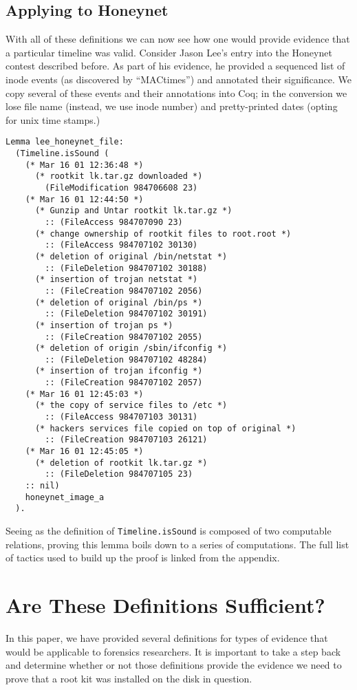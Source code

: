 \documentclass[nocopyrightspace]{sigplanconf}
\begin{document}
\subsection{Applying to Honeynet}
With all of these definitions we can now see how one would provide evidence
that a particular timeline was valid. Consider Jason Lee's entry\cite{lee}
into the Honeynet contest described before. As part of his evidence, he
provided a sequenced list of inode events (as discovered by ``MACtimes'') and
annotated their significance. We copy several of these events and their
annotations into Coq; in the conversion we lose file name (instead, we use
inode number) and pretty-printed dates (opting for unix time stamps.)

\begin{lstlisting}
Lemma lee_honeynet_file:
  (Timeline.isSound (
    (* Mar 16 01 12:36:48 *)
      (* rootkit lk.tar.gz downloaded *)
        (FileModification 984706608 23)
    (* Mar 16 01 12:44:50 *)
      (* Gunzip and Untar rootkit lk.tar.gz *)
        :: (FileAccess 984707090 23)
      (* change ownership of rootkit files to root.root *)
        :: (FileAccess 984707102 30130)
      (* deletion of original /bin/netstat *)
        :: (FileDeletion 984707102 30188)
      (* insertion of trojan netstat *)
        :: (FileCreation 984707102 2056) 
      (* deletion of original /bin/ps *)
        :: (FileDeletion 984707102 30191)
      (* insertion of trojan ps *)
        :: (FileCreation 984707102 2055) 
      (* deletion of origin /sbin/ifconfig *)
        :: (FileDeletion 984707102 48284)
      (* insertion of trojan ifconfig *)
        :: (FileCreation 984707102 2057) 
    (* Mar 16 01 12:45:03 *)
      (* the copy of service files to /etc *)
        :: (FileAccess 984707103 30131)  
      (* hackers services file copied on top of original *)
        :: (FileCreation 984707103 26121)
    (* Mar 16 01 12:45:05 *)
      (* deletion of rootkit lk.tar.gz *)
        :: (FileDeletion 984707105 23)   
    :: nil)
    honeynet_image_a
  ).
\end{lstlisting}

Seeing as the definition of {\tt Timeline.isSound} is composed of two
computable relations, proving this lemma boils down to a series of
computations. The full list of tactics used to build up the proof is linked
from the appendix.

\section{Are These Definitions Sufficient?}
In this paper, we have provided several definitions for types of evidence that
would be applicable to forensics researchers. It is important to take a step
back and determine whether or not those definitions provide the evidence we
need to prove that a root kit was installed on the disk in question. 
\end{document}
